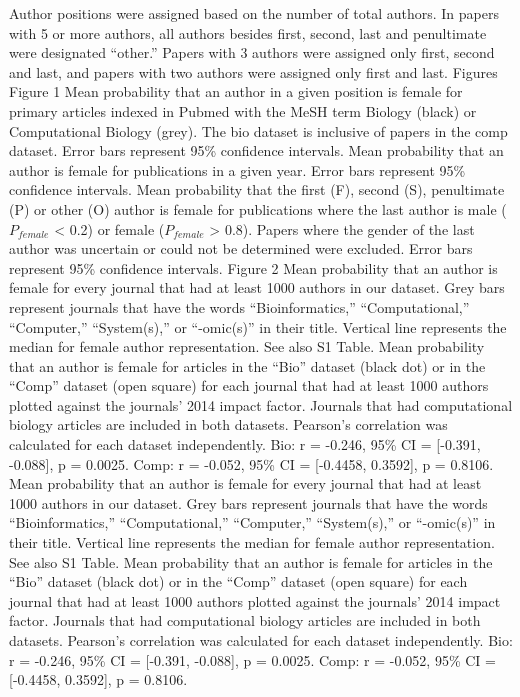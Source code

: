 \documentclass[11pt]{article}
\begin{document}
Author positions were assigned based on the number of total authors. In papers with 5 or more authors, all authors besides first, second, last and penultimate were designated “other.” Papers with 3 authors were assigned only first, second and last, and papers with two authors were assigned only first and last.
Figures
Figure 1
Mean probability that an author in a given position is female for primary articles indexed in Pubmed with the MeSH term Biology (black) or Computational Biology (grey). The bio dataset is inclusive of papers in the comp dataset. Error bars represent 95\% confidence intervals.
Mean probability that an author is female for publications in a given year. Error bars represent 95\% confidence intervals.
Mean probability that the first (F), second (S), penultimate (P) or other (O) author is female for publications where the last author is male ($P_{female}$ < 0.2) or female ($P_{female}$ > 0.8). Papers where the gender of the last author was uncertain or could not be determined were excluded. Error bars represent 95\% confidence intervals.
Figure 2
Mean probability that an author is female for every journal that had at least 1000 authors in our dataset. Grey bars represent journals that have the words “Bioinformatics,” “Computational,” “Computer,” “System(s),” or “-omic(s)” in their title. Vertical line represents the median for female author representation. See also S1 Table.
Mean probability that an author is female for articles in the “Bio” dataset (black dot) or in the “Comp” dataset (open square) for each journal that had at least 1000 authors plotted against the journals’ 2014 impact factor. Journals that had computational biology articles are included in both datasets. Pearson’s correlation was calculated for each dataset independently. Bio: r = -0.246, 95\% CI = [-0.391, -0.088], p = 0.0025. Comp: r = -0.052, 95\% CI = [-0.4458, 0.3592], p = 0.8106.
Mean probability that an author is female for every journal that had at least 1000 authors in our dataset. Grey bars represent journals that have the words “Bioinformatics,” “Computational,” “Computer,” “System(s),” or “-omic(s)” in their title. Vertical line represents the median for female author representation. See also S1 Table.
Mean probability that an author is female for articles in the “Bio” dataset (black dot) or in the “Comp” dataset (open square) for each journal that had at least 1000 authors plotted against the journals’ 2014 impact factor. Journals that had computational biology articles are included in both datasets. Pearson’s correlation was calculated for each dataset independently. Bio: r = -0.246, 95\% CI = [-0.391, -0.088], p = 0.0025. Comp: r = -0.052, 95\% CI = [-0.4458, 0.3592], p = 0.8106.
\end{document}
